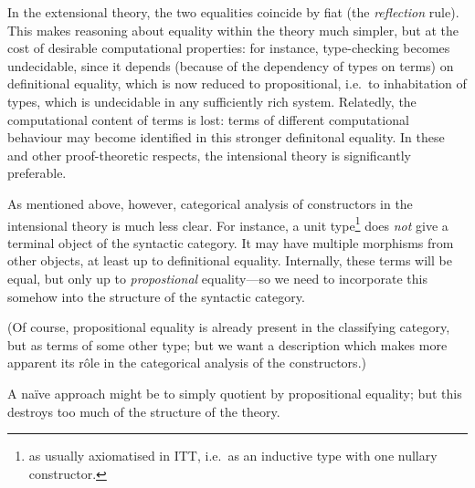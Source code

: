 \begin{para}
In the extensional theory, the two equalities coincide by fiat (the \emph{reflection} rule).  This makes reasoning about equality within the theory much simpler, but at the cost of desirable computational properties: for instance, type-checking becomes undecidable, since it depends (because of the dependency of types on terms) on definitional equality, which is now reduced to propositional, i.e.\ to inhabitation of types, which is undecidable in any sufficiently rich system.  Relatedly, the computational content of terms is lost: terms of different computational behaviour may become identified in this stronger definitonal equality.  In these and other proof-theoretic respects, the intensional theory is significantly preferable.

As mentioned above, however, categorical analysis of constructors in the intensional theory is much less clear.  For instance, a unit type\footnote{as usually axiomatised in ITT, i.e.\ as an inductive type with one nullary constructor.} does \emph{not} give a terminal object of the syntactic category.  It may have multiple morphisms from other objects, at least up to definitional equality.  Internally, these terms will be equal, but only up to \emph{propostional} equality---so we need to incorporate this somehow into the structure of the syntactic category.  

(Of course, propositional equality is already present in the classifying category, but as terms of some other type; but we want a description which makes more apparent its rôle in the categorical analysis of the constructors.)

A naïve approach might be to simply quotient by propositional equality; but this destroys too much of the structure of the theory. 
\end{para}

